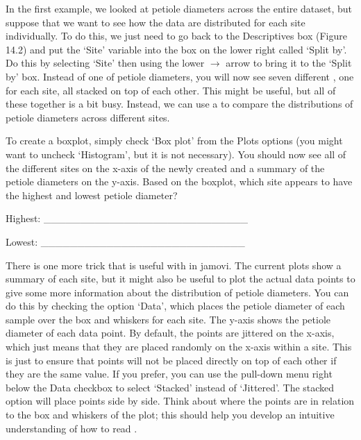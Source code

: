 \documentclass[
  openany]{krantz}
\begin{document}
In the first example, we looked at petiole diameters across the entire dataset, but suppose that we want to see how the data are distributed for each site individually.
To do this, we just need to go back to the Descriptives box (Figure 14.2) and put the `Site' variable into the box on the lower right called `Split by'.
Do this by selecting `Site' then using the lower \(\to\) arrow to bring it to the `Split by' box.
Instead of one  of petiole diameters, you will now see seven different , one for each site, all stacked on top of each other.
This might be useful, but all of these  together is a bit busy.
Instead, we can use a  to compare the distributions of petiole diameters across different sites.

To create a boxplot, simply check `Box plot' from the Plots options (you might want to uncheck `Histogram', but it is not necessary).
You should now see all of the different sites on the x-axis of the newly created  and a summary of the petiole diameters on the y-axis.
Based on the boxplot, which site appears to have the highest and lowest  petiole diameter?

Highest: \_\_\_\_\_\_\_\_\_\_\_\_\_\_\_\_\_\_\_\_\_\_\_\_\_\_\_\_

Lowest: \_\_\_\_\_\_\_\_\_\_\_\_\_\_\_\_\_\_\_\_\_\_\_\_\_\_\_\_

There is one more trick that is useful with  in jamovi.
The current plots show a summary of each site, but it might also be useful to plot the actual data points to give some more information about the distribution of petiole diameters.
You can do this by checking the option `Data', which places the petiole diameter of each sample over the box and whiskers for each site.
The y-axis shows the petiole diameter of each data point.
By default, the points are jittered on the x-axis, which just means that they are placed randomly on the x-axis within a site.
This is just to ensure that points will not be placed directly on top of each other if they are the same value.
If you prefer, you can use the pull-down menu right below the Data checkbox to select `Stacked' instead of `Jittered'.
The stacked option will place points side by side.
Think about where the points are in relation to the box and whiskers of the plot; this should help you develop an intuitive understanding of how to read .
\end{document}
